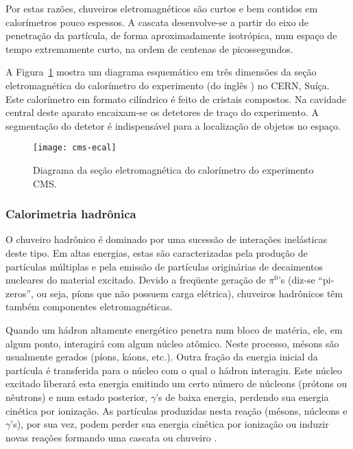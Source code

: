 Por estas razões, chuveiros eletromagnéticos são curtos e bem contidos em
calorímetros pouco espessos. A cascata desenvolve-se a partir do eixo de
penetração da par\-tí\-cu\-la, de forma aproximadamente isotrópica, num espaço
de tempo extremamente curto, na ordem de centenas de picossegundos.

A Figura~\ref{fig:cms-ecal} mostra um diagrama esquemático em três dimensões
da seção eletromagnética do calorímetro do experimento  (do inglês
) no CERN, Suíça. Este calorímetro em formato
cilíndrico é feito de cristais compostos. Na cavidade central deste aparato
encaixam-se os detetores de traço do experimento. A segmentação do detetor é
indispensável para a localização de objetos no espaço.

\begin{figure}
\begin{center}
\texttt{[image: cms-ecal]}
\end{center}
\caption{Diagrama da seção eletromagnética do calorímetro do experimento CMS.}
\label{fig:cms-ecal}
\end{figure}

\subsubsection{Calorimetria hadrônica}
\label{sec:calohad}

O chuveiro hadrônico é dominado por uma sucessão de interações inelásticas
deste tipo. Em altas energias, estas são caracterizadas pela produção de
partículas múltiplas e pela emissão de partículas originárias de decaimentos
nucleares do material excitado. Devido a freqüente geração de $\pi^{0}$'s
(diz-se ``pi-zeros'', ou seja, píons que não possuem carga elétrica),
chuveiros hadrônicos têm também componentes eletromagnéticas.

Quando um hádron altamente ener\-gé\-tico penetra num bloco de ma\-té\-ria,
ele, em algum ponto, interagi\-rá com algum nú\-cleo atômico. Neste processo,
mésons são usualmente gerados (píons, káons, etc.). Outra fração da energia
inicial da partícula é transferida para o núcleo com o qual o hádron
interagiu. Este núcleo excitado liberará esta energia emitindo um certo
nú\-mero de nú\-cleons (prótons ou nêutrons) e num estado posterior,
$\gamma$'s de baixa energia, perdendo sua energia cinética por ionização. As
partículas produzidas nesta reação (mésons, núcleons e $\gamma$'s), por sua
vez, podem perder sua energia cinética por ionização ou induzir novas reações
formando uma cascata ou chuveiro \cite{hadcal}.

